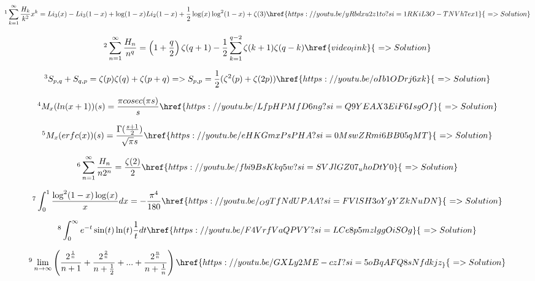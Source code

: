 \documentclass[12pt]{article}
\begin{document}
\[ \footnote{ Can you use the generating function of Harmonic Series to derive this?   Credit: Advanced Integration Techniques by Zaid Alyafeai } \sum_{k=1}^{\infty} \frac{H_k}{k^2} x^k = Li_3(x)-Li_3(1-x)+\log(1-x)Li_2(1-x)+ \frac{1}{2} \log(x)\log^2(1-x)+\zeta(3)     \href{https://youtu.be/yRbdxu2z1to?si=1RKiL3O-TNVh7ex1}{\,\, => Solution}   \]

\[ \footnote{ To be proved, someday in future   Credit: Advanced Integration Techniques by Zaid Alyafeai  } \sum_{n=1}^{\infty} \frac{H_n}{n^q} = \left(1+\frac{q}{2}\right) \zeta(q+1) - \frac{1}{2} \sum_{k=1}^{q-2} \zeta(k+1) \zeta(q-k)     \href{video_link}{\,\, => Solution}   \]

\[ \footnote{ To be proved, someday in future , symmetricity of Euler sums   } S_{p,q}+S_{q,p} = \zeta(p)\zeta(q)+\zeta(p+q) => S_{p,p}=\frac{1}{2}(\zeta^2(p)+\zeta(2p) )    \href{https://youtu.be/oIb1ODrj6xk}{\,\, => Solution}   \]

 
\[ \footnote{ Mellin Transform of ln(x+1)} M_x(ln(x+1))(s) = \frac{\pi cosec(\pi s)}{s}  \href{https://youtu.be/LfpHPMfD6ng?si=Q9YEAX3EiF6IsgOf}{\,\, => Solution}  \]

\[ \footnote{ Mellin Transform of erfc(x) } M_x(erfc(x))(s) = \frac{\Gamma(\frac{s+1}{2})}{\sqrt{\pi}s}    \href{https://youtu.be/eHKGmxPsPHA?si=0MswZRmi6BB05qMT}{\,\, => Solution}  \]

\[ \footnote{ A nice usage of Poly-logarithm} \sum_{n=1}^{\infty} \frac{H_n}{n2^n} = \frac{\zeta(2)}{2}     \href{https://youtu.be/fbi9BsKkq5w?si=SVJlGZ07_uhoDtY0}{\,\, => Solution}   \]
 
 
 \[ \footnote{ Harmonic number and poly-logarithm function might make maniplation easier Credit: Advanced Integration Techniques by Zaid Alyafeai} \int_0^1 \frac{\log^2(1-x) \log(x)}{x} dx = -\frac{\pi^4}{180}     \href{https://youtu.be/_OgTfNdUPAA?si=FVlSH3oYgYZkNuDN}{\,\, => Solution}    \]
 
 
 \[ \footnote{ The ultimate combination of exponential, trigonometric, logarithmic and rational function Credit: Advanced Integration Techniques by Zaid Alyafeai} \int_0^{\infty} e^{-t} \sin(t) \ln(t) \frac{1}{t} dt      \href{https://youtu.be/F4VrfVaQPVY?si=LCe8p5mzlggOiSOg}{\,\, => Solution}   \]
 
\[ \footnote{ Love you if you can see Reimann sum here. Problem from Soviet Union University Student Mathematical Olympiad, 1976} \lim_{n \to \infty} \left( \frac{2^{\frac{1}{n}}}{n+1} +
\frac{2^{\frac{2}{n}}}{n+\frac{1}{2}} + ... + \frac{2^{\frac{n}{n}}}{n+\frac{1}{n}} \right)    \href{https://youtu.be/GXLy2ME-czI?si=5oBqAFQ8sNfdkjz_}{\,\, => Solution}   \]
 
\end{document}
